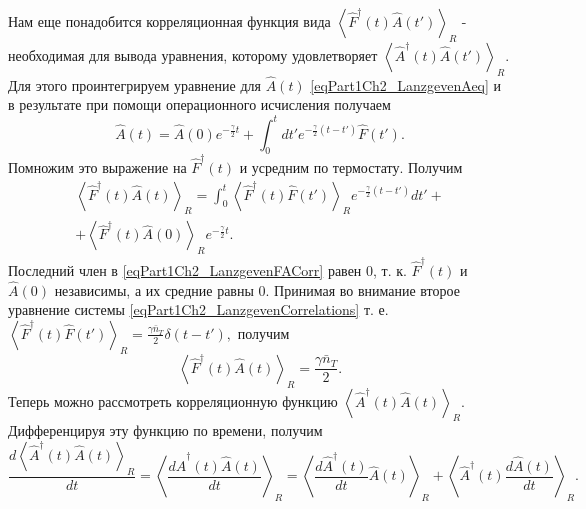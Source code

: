 Нам еще понадобится корреляционная функция вида
\(
\left<\hat{F}^{\dag}\left(t\right)\hat{A}\left(t'\right)\right>_R 
\) 
- необходимая для вывода уравнения, которому удовлетворяет 
\(
\left<\hat{A}^{\dag}\left(t\right)\hat{A}\left(t'\right)\right>_R 
\). Для этого проинтегрируем уравнение для $\hat{A}\left(t\right)$
\eqref{eqPart1Ch2_LanzgevenAeq} и в результате при помощи
операционного исчисления получаем
\begin{equation} 
\hat{A}\left(t\right) = \hat{A}\left(0\right)e^{-\frac{\gamma}{2}t} +
\int_0^t d t' e^{-\frac{\gamma}{2}\left(t - t'\right)} \hat{F}\left(t'\right).
\nonumber
\end{equation} 
Помножим это выражение на $\hat{F}^{\dag}\left(t\right)$ и усредним по
термостату. Получим
\begin{eqnarray} 
\left<\hat{F}^{\dag}\left(t\right)\hat{A}\left(t\right)\right>_R = 
\int_0^t  
\left<\hat{F}^{\dag}\left(t\right)\hat{F}\left(t'\right)\right>_R 
e^{-\frac{\gamma}{2}\left(t - t'\right)}
d t' +
\nonumber \\
+ \left<\hat{F}^{\dag}\left(t\right)\hat{A}\left(0\right)\right>_R e^{-\frac{\gamma}{2}t}.
\label{eqPart1Ch2_LanzgevenFACorr}
\end{eqnarray} 
Последний член в \eqref{eqPart1Ch2_LanzgevenFACorr} равен $0$, т. к. 
$\hat{F}^{\dag}\left(t\right)$ и $\hat{A}\left(0\right)$ независимы,
 а их средние равны $0$. Принимая во внимание второе уравнение системы 
\eqref{eqPart1Ch2_LanzgevenCorrelations} т. е.
\(
\left<\hat{F}^{\dag}\left(t\right)\hat{F}\left(t'\right)\right>_R = 
\frac{\gamma \bar{n}_{T}}{2} \delta\left(t - t'\right),
\)
получим
\begin{equation}
\left<\hat{F}^{\dag}\left(t\right)\hat{A}\left(t\right)\right>_R = 
\frac{\gamma \bar{n}_{T}}{2}.
\nonumber
\end{equation}
Теперь можно рассмотреть корреляционную функцию 
\(
\left<\hat{A}^{\dag}\left(t\right)\hat{A}\left(t\right)\right>_R
\). Дифференцируя эту функцию по времени, получим
\begin{equation}
\frac{d \left<\hat{A}^{\dag}\left(t\right)\hat{A}\left(t\right)\right>_R}{d
t}=
\left<\frac{d \hat{A}^{\dag}\left(t\right)\hat{A}\left(t\right)}{d
t}\right>_R =
\left<\frac{d \hat{A}^{\dag}\left(t\right)}{d
t} \hat{A}\left(t\right) \right>_R + 
\left<\hat{A}^{\dag}\left(t\right)\frac{d \hat{A}\left(t\right)}{d
t}  \right>_R.
\label{eqPart1Ch2_Lanzgeven_dAA}
\end{equation}
